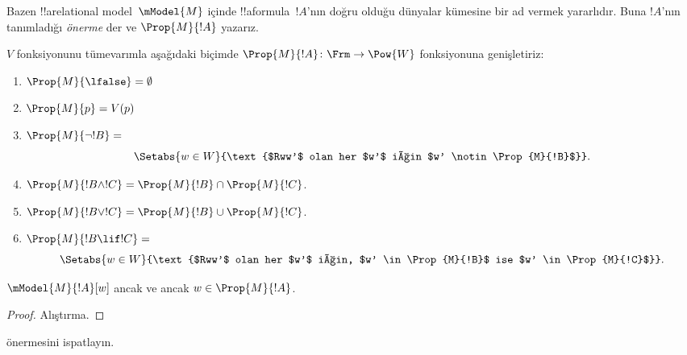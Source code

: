 



Bazen !!a{relational model}~$\mModel{M}$ içinde !!a{formula}~$!A$'nın
doğru olduğu dünyalar kümesine bir ad vermek yararlıdır. Buna $!A$'nın
tanımladığı \emph{önerme} der ve $\Prop{M}{!A}$ yazarız.

\begin{defn}
  $V$ fonksiyonunu tümevarımla aşağıdaki biçimde $\Prop{M}{!A} \colon \Frm
  \to \Pow{W}$ fonksiyonuna genişletiriz:
  \begin{enumerate}
  \item $\Prop{M}{\lfalse} = \emptyset$
  \item $\Prop{M}{p} = V(p)$
  \item $\Prop{M}{\lnot !B} = {}$
    \[
      \Setabs{w \in W}{\text{$Rww'$ olan her $w'$ için $w'
          \notin \Prop{M}{!B}$}}.
    \]
  \item $\Prop{M}{!B \land !C} = \Prop{M}{!B} \cap \Prop{M}{!C}$.
  \item $\Prop{M}{!B \lor !C} = \Prop{M}{!B} \cup \Prop{M}{!C}$.
  \item $\Prop{M}{!B \lif !C} = {}$
    \[
      \Setabs{w \in W}{\text{$Rww'$ olan her $w'$ için, $w'
          \in \Prop{M}{!B}$ ise $w' \in \Prop{M}{!C}$}}.
    \]
  \end{enumerate}
\end{defn}

\begin{prop}
  $\mModel{M}{!A}[w]$ ancak ve ancak $w \in \Prop{M}{!A}$.
\end{prop}

\begin{proof}
  Alıştırma.
\end{proof}

\begin{prob}
   önermesini ispatlayın.
\end{prob}

